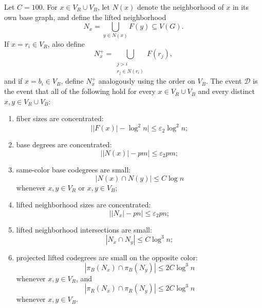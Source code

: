 \begin{definition}
Let \(C=100\).  For \(x\in V_R\cup V_B\), let \(N(x)\) denote the neighborhood
of \(x\) in its own base graph, and define the lifted neighborhood
\[
N_x=\bigcup_{y\in N(x)}F(y)\subseteq V(G).
\]
If \(x=r_i\in V_R\), also define
\[
N_x^+=\bigcup_{\substack{j>i\\ r_j\in N(r_i)}}F(r_j),
\]
and if \(x=b_i\in V_B\), define \(N_x^+\) analogously using the order on
\(V_B\).  The event \(\mathcal D\) is the event that all of the following hold
for every \(x\in V_R\cup V_B\) and every distinct \(x,y\in V_R\cup V_B\):
\begin{enumerate}
\item fiber sizes are concentrated:
\[
\bigl||F(x)|-\log^2 n\bigr|\le \varepsilon_2\log^2 n;
\]
\item base degrees are concentrated:
\[
\bigl||N(x)|-pm\bigr|\le \varepsilon_2pm;
\]
\item same-color base codegrees are small:
\[
|N(x)\cap N(y)|\le C\log n
\]
whenever \(x,y\in V_R\) or \(x,y\in V_B\);
\item lifted neighborhood sizes are concentrated:
\[
\bigl||N_x|-pn\bigr|\le \varepsilon_2pn;
\]
\item lifted neighborhood intersections are small:
\[
|N_x\cap N_y|\le C\log^3 n;
\]
\item projected lifted codegrees are small on the opposite color:
\[
|\pi_B(N_x)\cap\pi_B(N_y)|\le 2C\log^3 n
\]
whenever \(x,y\in V_R\), and
\[
|\pi_R(N_x)\cap\pi_R(N_y)|\le 2C\log^3 n
\]
whenever \(x,y\in V_B\).
\end{enumerate}
\end{definition}
